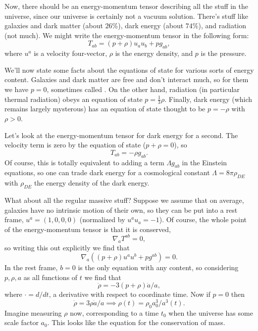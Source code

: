 Now, there should be an energy-momentum tensor describing all the stuff in the universe, since our universe is certainly not a vacuum solution. There's stuff like galaxies and dark matter (about $26$\%), dark energy (about $74$\%), and radiation (not much). We might write the energy-momentum tensor in the following form:
$$T_{ab}=(p+\rho)u_a u_b +p g_{ab},$$
where $u^a$ is a velocity four-vector, $\rho$ is the energy density, and $p$ is the pressure.

We'll now state some facts about the equations of state for various sorts of energy content. Galaxies and dark matter are free and don't interact much, so for them we have $p=0$, sometimes called . On the other hand, radiation (in particular thermal radiation) obeys an equation of state $p=\frac{1}{3}\rho$. Finally, dark energy (which remains largely mysterous) has an equation of state thought to be $p=-\rho$ with $\rho>0$.

Let's look at the energy-momentum tensor for dark energy for a second. The velocity term is zero by the equation of state ($p+\rho=0$), so
$$T_{ab}=-\rho g_{ab}.$$
Of course, this is totally equivalent to adding a term $\Lambda g_{ab}$ in the Einstein equations, so one can trade dark energy for a cosmological constant $\Lambda=8\pi \rho_{DE}$ with $\rho_{DE}$ the energy density of the dark energy.

What about all the regular massive stuff? Suppose we assume that on average, galaxies have no intrinsic motion of their own, so they can be put into a rest frame, $u^a=(1,0,0,0)$ (normalized by $u^a u_a=-1$). Of course, the whole point of the energy-momentum tensor is that it is conserved,
$$\nabla_a T^{ab}=0,$$
so writing this out explicitly we find that
$$\nabla_a((p+\rho)u^a u^b + p g^{ab})=0.$$
In the rest frame, $b=0$ is the only equation with any content, so considering $p,\rho,a$ as all functions of $t$ we find that
$$\dot \rho=-3(p+\rho)\dot a/a,$$
where $\cdot=d/dt$, a derivative with respect to coordinate time. Now if $p=0$ then
$$\dot \rho =3\rho \dot a/a \implies \rho(t)=\rho_0 a_0^3/a^3(t).$$
Imagine measuring $\rho$ now, corresponding to a time $t_0$ when the universe has some scale factor $a_0$. This looks like the equation for the conservation of mass.

